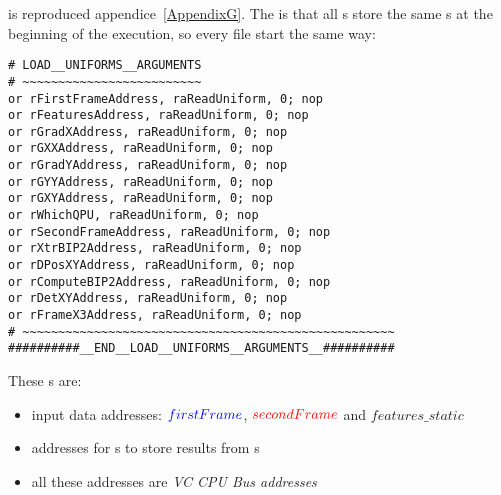  is reproduced appendice~\ref{AppendixG}. The  is that all \qpu{}s store the same \uni{}s at the beginning of the execution, so every  file start the same way:

\begin{lstlisting}
# LOAD__UNIFORMS__ARGUMENTS
# ~~~~~~~~~~~~~~~~~~~~~~~~~
or rFirstFrameAddress, raReadUniform, 0; nop
or rFeaturesAddress, raReadUniform, 0; nop
or rGradXAddress, raReadUniform, 0; nop
or rGXXAddress, raReadUniform, 0; nop
or rGradYAddress, raReadUniform, 0; nop
or rGYYAddress, raReadUniform, 0; nop
or rGXYAddress, raReadUniform, 0; nop
or rWhichQPU, raReadUniform, 0; nop
or rSecondFrameAddress, raReadUniform, 0; nop
or rXtrBIP2Address, raReadUniform, 0; nop
or rDPosXYAddress, raReadUniform, 0; nop
or rComputeBIP2Address, raReadUniform, 0; nop
or rDetXYAddress, raReadUniform, 0; nop
or rFrameX3Address, raReadUniform, 0; nop
# ~~~~~~~~~~~~~~~~~~~~~~~~~~~~~~~~~~~~~~~~~~~~~~~~~~~~
##########__END__LOAD__UNIFORMS__ARGUMENTS__##########
\end{lstlisting}

These \uni{}s are:
\begin{itemize}
	\item input data addresses: $\textcolor{blue}{firstFrame}$, $\textcolor{red}{secondFrame}$ and $features\_static$
	\item addresses for \qpu{}s to store results from s
	\item all these addresses are \emph{VC CPU Bus addresses}
\end{itemize}

